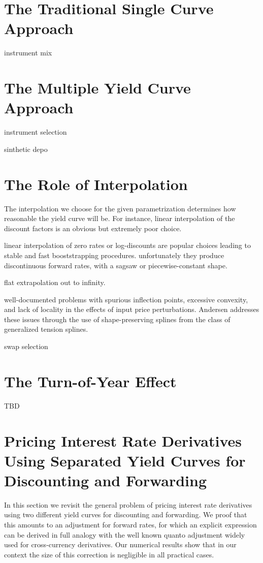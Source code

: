 \documentclass[11pt,reqno]{amsart}
\begin{document}
\section{The Traditional Single Curve Approach}

instrument mix

\section{The Multiple Yield Curve Approach}

instrument selection

sinthetic depo

\section{The Role of Interpolation}

The interpolation we choose for the given parametrization determines how
reasonable the yield curve will be. For instance, linear interpolation of
the discount factors is an obvious but extremely poor choice.

linear interpolation of zero rates or log-discounts are popular choices
leading to stable and fast booststrapping procedures. unfortunately they
produce discontinuous forward rates, with a sagsaw or piecewise-constant
shape.

flat extrapolation out to infinity.

well-documented problems with spurious inflection points, excessive
convexity, and lack of locality in the effects of input price perturbations.
Andersen \cite{Andersen2005} addresses these issues through the use of
shape-preserving splines from the class of generalized tension splines.

swap selection

\section{The Turn-of-Year Effect}

TBD

\section{Pricing Interest Rate Derivatives Using Separated Yield Curves for
Discounting and Forwarding}

In this section we revisit the general problem of pricing interest rate
derivatives using two different yield curves for discounting and forwarding.
We proof that this amounts to an adjustment for forward rates, for which an
explicit expression can be derived in full analogy with the well known
quanto adjustment widely used for cross-currency derivatives. Our numerical
results show that in our context the size of this correction is negligible
in all practical cases.
\end{document}
